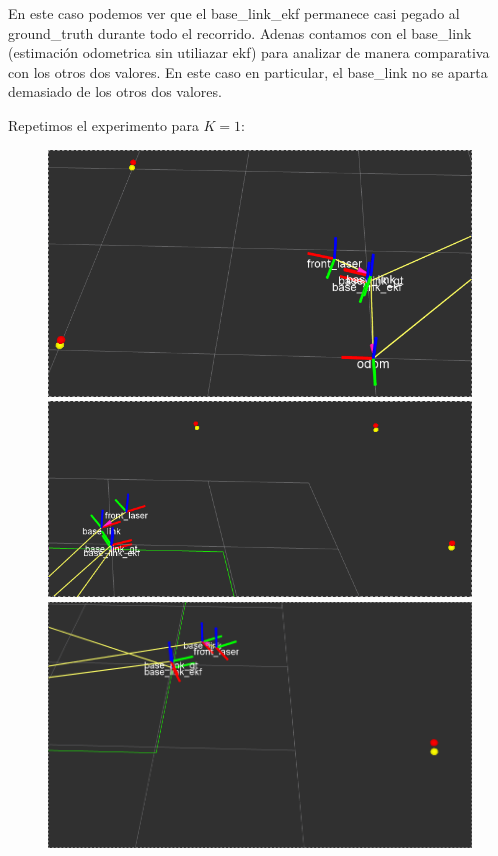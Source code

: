 En este caso podemos ver que el base\_link\_ekf permanece casi pegado al ground\_truth durante todo el recorrido. Adenas contamos con el base\_link (estimación odometrica sin utiliazar ekf) para analizar de manera comparativa con los otros dos valores. En este caso en particular, el base\_link no se aparta demasiado de los otros dos valores.

Repetimos el experimento para $K=1$:

\begin{figure}[!htb]
  \includegraphics[width=\linewidth]{imagenesEKF/K1/1.png}
\endminipage\hfill
{}
  \includegraphics[width=\linewidth]{imagenesEKF/K1/3.png}
\endminipage\hfill
{}%
  \includegraphics[width=\linewidth]{imagenesEKF/K1/4.png}
\endminipage
\end{figure}

